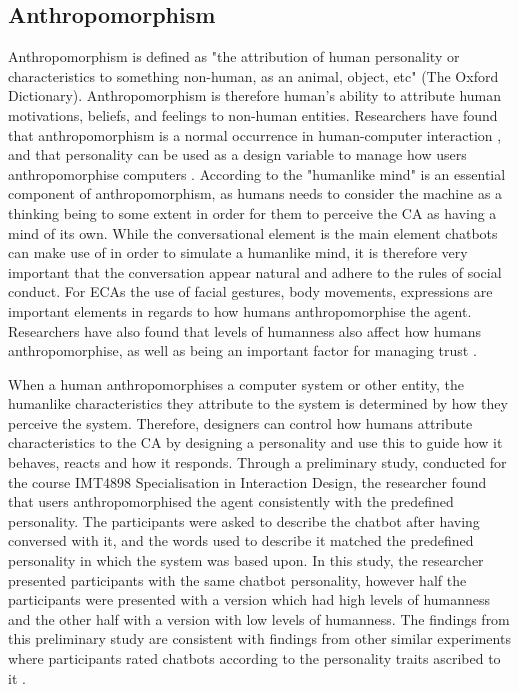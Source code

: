 \subsection{Anthropomorphism}
Anthropomorphism is defined as "the attribution of human personality or characteristics to something non-human, as an animal, object, etc" (The Oxford Dictionary). Anthropomorphism is therefore human's ability to attribute human motivations, beliefs, and feelings to non-human entities. Researchers have found that anthropomorphism is a normal occurrence in human-computer interaction \citep{Reeves1996,Cohen2004,Pearl2017,Lee2010}, and that personality can be used as a design variable to manage how users anthropomorphise computers \citep{Xiao2005}. According to \cite{Schroeder2016} the "humanlike mind" is an essential component of anthropomorphism, as humans needs to consider the machine as a thinking being to some extent in order for them to perceive the CA as having a mind of its own. While the conversational element is the main element chatbots can make use of in order to simulate a humanlike mind, it is therefore very important that the conversation appear natural and adhere to the rules of social conduct. For ECAs the use of facial gestures, body movements, expressions are important elements in regards to how humans anthropomorphise the agent. Researchers have also found that levels of humanness also affect how humans anthropomorphise, as well as being an important factor for managing trust \citep{Prada2003,Meyer2016,Dautenhahn2002,Terada2015,Epley2007,Lee2004}.

When a human anthropomorphises a computer system or other entity, the humanlike characteristics they attribute to the system is determined by how they perceive the system. Therefore, designers can control how humans attribute characteristics to the CA by designing a personality and use this to guide how it behaves, reacts and how it responds. Through a preliminary study, conducted for the course IMT4898 Specialisation in Interaction Design, the researcher found that users anthropomorphised the agent consistently with the predefined personality. The participants were asked to describe the chatbot after having conversed with it, and the words used to describe it matched the predefined personality in which the system was based upon. In this study, the researcher presented participants with the same chatbot personality, however half the participants were presented with a version which had high levels of humanness and the other half with a version with low levels of humanness. The findings from this preliminary study are consistent with findings from other similar experiments where participants rated chatbots according to the personality traits ascribed to it \citep{Holtgraves2007}.

